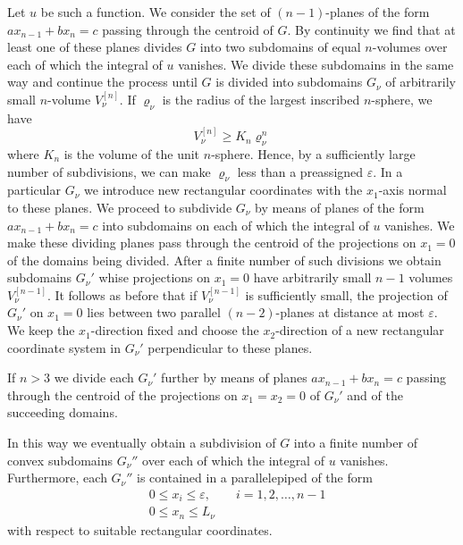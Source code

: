 \documentclass{article}
\theoremstyle{remarks}
\begin{document}
Let $u$ be such a function. We consider the set of $(n-1)$-planes of the form
$ax_{n-1}+bx_n = c$ passing through the centroid of $G$. By continuity we find
that at least one of these planes divides $G$ into two subdomains of equal
$n$-volumes over each of which the integral of $u$ vanishes.
We divide these subdomains in the same way and continue the process until
$G$ is divided into subdomains $G_\nu$ of arbitrarily small $n$-volume $V_\nu^{[n]}$.
If $\varrho_\nu$ is the radius of the largest inscribed $n$-sphere, we have
\begin{equation}\label{eq:4.1}
  V_\nu^{[n]} \geq K_n \varrho_\nu^n
\end{equation}
where $K_n$ is the volume of the unit $n$-sphere. Hence, by a sufficiently
large number of subdivisions, we can make $\varrho_\nu$ less than a preassigned
$\varepsilon$. In a particular $G_\nu$ we introduce new rectangular coordinates
with the $x_1$-axis normal to these planes. We proceed to subdivide $G_\nu$
by means of planes of the form $ax_{n-1}+bx_n = c$ into subdomains on each of
which the integral of $u$ vanishes. We make these dividing planes pass through
the centroid of the projections on $x_1=0$ of the domains being divided.
After a finite number of such divisions we obtain subdomains $G_\nu'$
whise projections on $x_1=0$ have arbitrarily small $n-1$ volumes $V_\nu^{[n-1]}$.
It follows as before that if $V_\nu^{[n-1]}$ is sufficiently small,
the projection of $G_\nu'$ on $x_1=0$ lies between two parallel $(n-2)$-planes
at distance at most $\varepsilon$. We keep the $x_1$-direction fixed and choose
the $x_2$-direction of a new rectangular coordinate system in $G_\nu'$
perpendicular to these planes.

If $n>3$ we divide each $G_\nu'$ further by means of planes $ax_{n-1}+bx_n = c$
passing through the centroid of the projections on $x_1=x_2=0$
of $G_\nu'$ and of the succeeding domains.

In this way we eventually obtain a subdivision of $G$ into a finite number
of convex subdomains $G_\nu''$ over each of which the integral of $u$ vanishes.
Furthermore, each $G_\nu''$ is contained in a parallelepiped of the form
\begin{equation}\label{eq:4.2}
  \begin{aligned}
    & 0\leq x_i \leq\varepsilon, \qquad i=1,2,\ldots,n-1 \\
    & 0\leq x_n \leq L_\nu
  \end{aligned}
\end{equation}
with respect to suitable rectangular coordinates.
\end{document}
